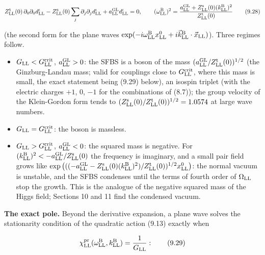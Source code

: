 \documentclass[
  10pt,
]{article}
\providecommand{\tightlist}{%
  \setlength{\itemsep}{0pt}\setlength{\parskip}{0pt}}
\begin{document}
\[Z^{\rm t}_{\rm LL}(0)\,\partial_0\partial_0d^\iota_{\rm LL}-Z^{\rm s}_{\rm LL}(0)\sum_j\partial_j\partial_jd^\iota_{\rm LL}+a^{\rm GL}_{\rm LL}d^\iota_{\rm LL}=0,\qquad(\omega^{\rm B}_{\rm LL})^2=\frac{a^{\rm GL}_{\rm LL}+Z^{\rm s}_{\rm LL}(0)(k^{\rm B}_{\rm LL})^2}{Z^{\rm t}_{\rm LL}(0)}\tag{9.28}\]

(the second form for the plane waves
\(\exp(-i\omega^{\rm B}_{\rm LL}x^0_{\rm LL}+i\vec k^{\rm B}_{\rm LL}\cdot\vec x_{\rm LL})\)).
Three regimes follow.

\begin{itemize}
\tightlist
\item
  \(G_{\rm LL}<G^{\rm crit}_{\rm LL}\), \(a^{\rm GL}_{\rm LL}>0\): the
  SFBS is a boson of the mass
  \((a^{\rm GL}_{\rm LL}/Z^{\rm t}_{\rm LL}(0))^{1/2}\) (the
  Ginzburg-Landau mass; valid for couplings close to
  \(G^{\rm crit}_{\rm LL}\), where this mass is small, the exact
  statement being (9.29) below), an isospin triplet (with the electric
  charges \(+1\), \(0\), \(-1\) for the combinations of (8.7)); the
  group velocity of the Klein-Gordon form tends to
  \((Z^{\rm s}_{\rm LL}(0)/Z^{\rm t}_{\rm LL}(0))^{1/2}=1.0574\) at
  large wave numbers.
\item
  \(G_{\rm LL}=G^{\rm crit}_{\rm LL}\): the boson is massless.
\item
  \(G_{\rm LL}>G^{\rm crit}_{\rm LL}\), \(a^{\rm GL}_{\rm LL}<0\): the
  squared mass is negative. For
  \((k^{\rm B}_{\rm LL})^2<-a^{\rm GL}_{\rm LL}/Z^{\rm s}_{\rm LL}(0)\)
  the frequency is imaginary, and a small pair field grows like
  \(\exp\big(((-a^{\rm GL}_{\rm LL}-Z^{\rm s}_{\rm LL}(0)(k^{\rm B}_{\rm LL})^2)/Z^{\rm t}_{\rm LL}(0))^{1/2}x^0_{\rm LL}\big)\):
  the normal vacuum is unstable, and the SFBS condenses until the terms
  of fourth order of \(\Omega_{\rm LL}\) stop the growth. This is the
  analogue of the negative squared mass of the Higgs field; Sections 10
  and 11 find the condensed vacuum.
\end{itemize}

\textbf{The exact pole.} Beyond the derivative expansion, a plane wave
solves the stationarity condition of the quadratic action (9.13) exactly
when

\[\chi^{\rm pr}_{\rm LL}(\omega^{\rm B}_{\rm LL},k^{\rm B}_{\rm LL})=\frac1{G_{\rm LL}}:\tag{9.29}\]
\end{document}
